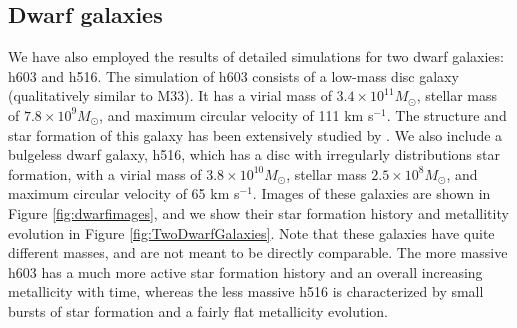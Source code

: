 \documentclass[a4paper,fleqn,usenatbib]{mnras}
\newcommand\msun{M_\odot}
\newcommand\DwarfOne{h603}
\newcommand\DwarfTwo{h516}
\begin{document}
\subsection{Dwarf galaxies}

We have also employed the results of detailed simulations for two dwarf galaxies: \DwarfOne{} and \DwarfTwo{}.  The simulation of h603 consists of a low-mass disc galaxy (qualitatively similar to M33).  It has a virial mass of $3.4 \times 10^{11} \msun$, stellar mass of $7.8 \times 10^9 \msun$, and maximum circular velocity of 111 km s$^{-1}$.  The structure and star formation of this galaxy has been extensively studied by \citet{Christensen14b}.  We also include a bulgeless dwarf galaxy, h516, which has a disc with irregularly distributions star formation, with a virial mass of $3.8 \times 10^{10}\msun$, stellar mass $2.5 \times 10^8 \msun$, and maximum circular velocity of 65 km s$^{-1}$.  Images of these galaxies are shown in Figure \ref{fig:dwarfimages}, and we show their star formation history and metallitity evolution in  Figure \ref{fig:TwoDwarfGalaxies}.  Note that these galaxies have quite different masses, and are not meant to be directly comparable.  The more massive h603 has a much more active star formation history and an overall increasing metallicity with time, whereas the less massive h516 is characterized by small bursts of star formation and a fairly flat metallicity evolution.

\end{document}
